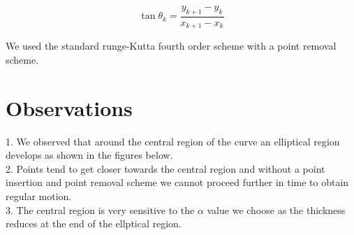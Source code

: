 \documentclass[12pt,twoside]{article}
\begin{document}
\begin{equation}
\tan\theta_k=\frac{y_{k+1} - y_k}{x_{k+1} -x_k}
\end{equation}

We used the standard runge-Kutta fourth order scheme with a point removal scheme.

\section{Observations}
1. We observed that around the central region of the curve an elliptical region develops         as shown in the figures below. \\

2. Points tend to get closer towards the central region and without a point insertion and point removal scheme we cannot proceed further in time to obtain regular motion.\\

3. The central region is very sensitive to the $\alpha$ value we choose as the thickness reduces at the end of the ellptical region.
\end{document}
